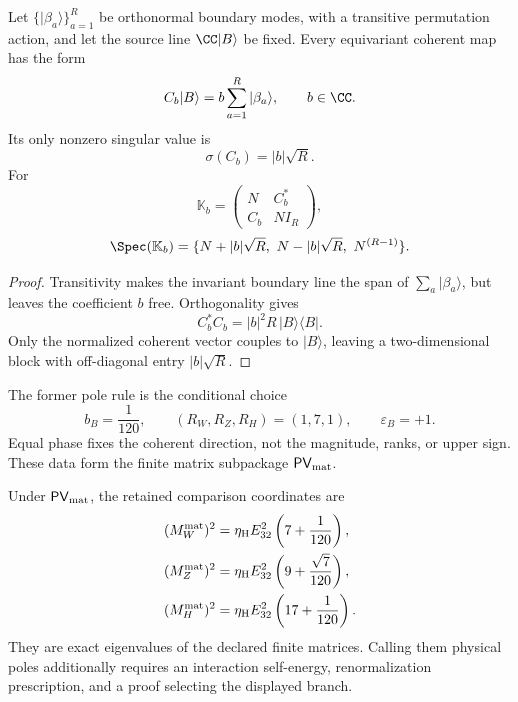 \documentclass[12pt,a4paper]{article}
\newcommand{\etaH}{\eta_{\rm H}}
\begin{document}
\begin{theorem}
\label{p6:thm:coherent-boundary-family}
Let \(\{|\beta_a\rangle\}_{a=1}^R\) be orthonormal boundary modes, with a
transitive permutation action, and let the source line
\(\CC|B\rangle\) be fixed.  Every equivariant coherent map has the form
\[
C_b|B\rangle=b\sum_{a=1}^R|\beta_a\rangle,
\qquad b\in\CC.
\]
Its only nonzero singular value is
\[
\sigma(C_b)=|b|\sqrt R.
\]
For
\[
\mathbb K_b=
\begin{pmatrix}
N&C_b^*\\
C_b&NI_R
\end{pmatrix},
\]
\[
\Spec(\mathbb K_b)
=
\{N+|b|\sqrt R,\ N-|b|\sqrt R,\ N^{(R-1)}\}.
\]
\end{theorem}

\begin{proof}
Transitivity makes the invariant boundary line the span of
\(\sum_a|\beta_a\rangle\), but leaves the coefficient \(b\) free.
Orthogonality gives
\[
C_b^*C_b=|b|^2R\,|B\rangle\langle B|.
\]
Only the normalized coherent vector couples to \(|B\rangle\), leaving a
two-dimensional block with off-diagonal entry \(|b|\sqrt R\).
\end{proof}

\begin{corollary}[Status of \(1/120\)]
\label{p6:cor:one-over-120}
The former pole rule is the conditional choice
\[
b_B=\frac1{120},
\qquad
(R_W,R_Z,R_H)=(1,7,1),
\qquad
\varepsilon_B=+1.
\]
Equal phase fixes the coherent direction, not the magnitude, ranks, or upper
sign.  These data form the finite matrix subpackage
\(\mathsf{PV}_{\rm mat}\).
\end{corollary}

\begin{definition}
\label{p6:def:conditional-pole-packet}
Under \(\mathsf{PV}_{\rm mat}\), the retained comparison coordinates are
\[
\begin{aligned}
(M_W^{\rm mat})^2
&=\etaH E_{32}^2\left(7+\frac1{120}\right),\\
(M_Z^{\rm mat})^2
&=\etaH E_{32}^2\left(9+\frac{\sqrt7}{120}\right),\\
(M_H^{\rm mat})^2
&=\etaH E_{32}^2\left(17+\frac1{120}\right).
\end{aligned}
\]
They are exact eigenvalues of the declared finite matrices.  Calling them
physical poles additionally requires an interaction self-energy,
renormalization prescription, and a proof selecting the displayed branch.
\end{definition}
\end{document}
